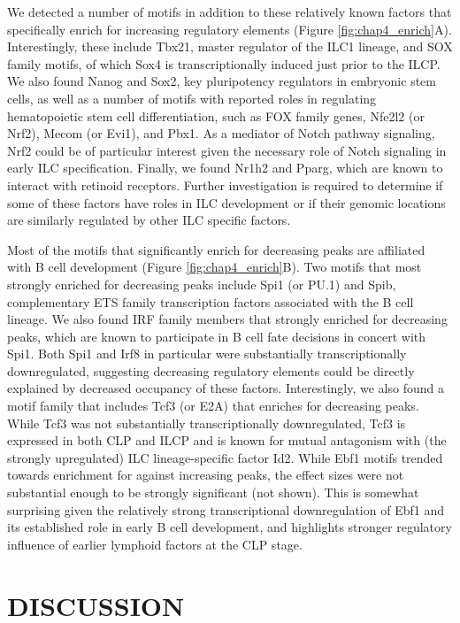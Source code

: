 We detected a number of motifs in addition to these relatively known factors that specifically enrich for increasing regulatory elements (Figure \ref{fig:chap4_enrich}A). Interestingly, these include Tbx21, master regulator of the ILC1 lineage, and SOX family motifs, of which Sox4 is transcriptionally induced just prior to the ILCP. We also found Nanog and Sox2, key pluripotency regulators in embryonic stem cells, as well as a number of motifs with reported roles in regulating hematopoietic stem cell differentiation, such as FOX family genes, Nfe2l2 (or Nrf2), Mecom (or Evi1), and Pbx1. As a mediator of Notch pathway signaling, Nrf2 could be of particular interest given the necessary role of Notch signaling in early ILC specification. Finally, we found Nr1h2 and Pparg, which are known to interact with retinoid receptors. Further investigation is required to determine if some of these factors have roles in ILC development or if their genomic locations are similarly regulated by other ILC specific factors.

Most of the motifs that significantly enrich for decreasing peaks are affiliated with B cell development (Figure \ref{fig:chap4_enrich}B). Two motifs that most strongly enriched for decreasing peaks include Spi1 (or PU.1) and Spib, complementary ETS family transcription factors associated with the B cell lineage. We also found IRF family members that strongly enriched for decreasing peaks, which are known to participate in B cell fate decisions in concert with Spi1. Both Spi1 and Irf8 in particular were substantially transcriptionally downregulated, suggesting decreasing regulatory elements could be directly explained by decreased occupancy of these factors. Interestingly, we also found a motif family that includes Tcf3 (or E2A) that enriches for decreasing peaks. While Tcf3 was not substantially transcriptionally downregulated, Tcf3 is expressed in both CLP and ILCP and is known for mutual antagonism with (the strongly upregulated) ILC lineage-specific factor Id2. While Ebf1 motifs trended towards enrichment for against increasing peaks, the effect sizes were not substantial enough to be strongly significant (not shown). This is somewhat surprising given the relatively strong transcriptional downregulation of Ebf1 and its established role in early B cell development, and highlights stronger regulatory influence of earlier lymphoid factors at the CLP stage. 

\section{DISCUSSION}

